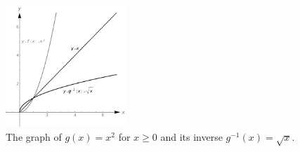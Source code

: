 \begin{figure}[H]
	\begin{center}
			\includegraphics[width=0.4\textwidth]{fig_functions_40}
	\caption{The graph of $g(x) = x^2$ for $x \geq 0$ and its inverse $g^{-1}(x)=\sqrt{x}$.}
	\label{fig_functions_40}
	\end{center}
\end{figure}


